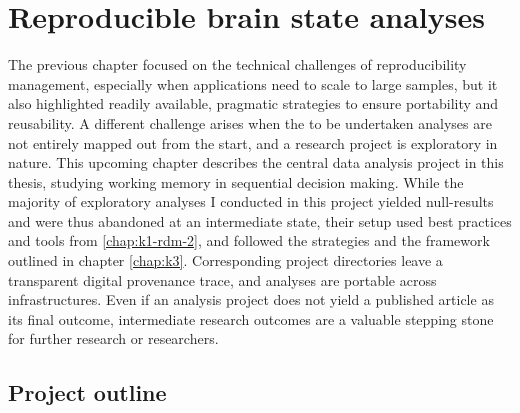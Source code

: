 

\chapter{Reproducible brain state analyses}
\label{k5}

The previous chapter focused on the technical challenges of reproducibility management, especially when applications need to scale to large samples, but it also highlighted readily available, pragmatic strategies to ensure portability and reusability.
A different challenge arises when the to be undertaken analyses are not entirely mapped out from the start, and a research project is exploratory in nature.
This upcoming chapter describes the central data analysis project in this thesis, studying working memory in sequential decision making.
While the majority of exploratory analyses I conducted in this project yielded null-results and were thus abandoned at an intermediate state, their setup used best practices and tools from \ref{chap:k1-rdm-2}, and followed the strategies and the framework outlined in chapter \ref{chap:k3}.
Corresponding project directories leave a transparent digital provenance trace, and analyses are portable across infrastructures.
Even if an analysis project does not yield a published article as its final outcome, intermediate research outcomes are a valuable stepping stone for further research or researchers.

\section{Project outline}

